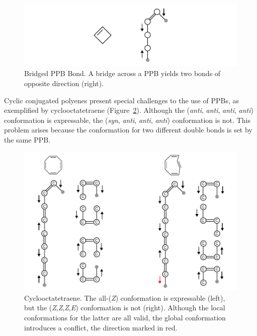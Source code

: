 \documentclass{article}
\begin{document}
\begin{figure}
    \centering
    \includegraphics[width=\columnwidth]{bridged-ppb-bond.pdf}
    \caption{Bridged PPB Bond. A bridge across a PPB yields two bonds of opposite direction (right).}
    \label{fig:bridged-ppb-bond}
\end{figure}

Cyclic conjugated polyenes present special challenges to the use of PPBs, as exemplified by cyclooctatetraene (Figure~\ref{fig:cyclooctatetraene}). Although the (\textit{anti}, \textit{anti}, \textit{anti}, \textit{anti}) conformation is expressable, the (\textit{syn}, \textit{anti}, \textit{anti}, \textit{anti}) conformation is not. This problem arises because the conformation for two different double bonds is set by the same PPB.

\begin{figure}
    \centering
    \includegraphics[width=\columnwidth]{cyclooctatetraene.pdf}
    \caption{Cyclooctatetraene. The all-(\textit{Z}) conformation is expressable (left), but the (\textit{Z},\textit{Z},\textit{Z},\textit{E}) conformation is not (right). Although the local conformations for the latter are all valid, the global conformation introduces a conflict, the direction marked in red.}
    \label{fig:cyclooctatetraene}
\end{figure}
\end{document}
